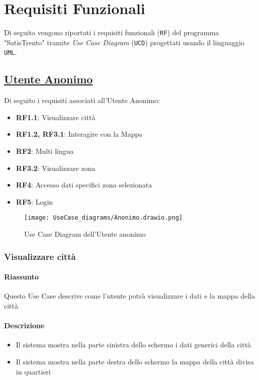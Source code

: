 \chapter{Requisiti Funzionali}
\label{ch:requisitiFunzionali}

Di seguito vengono riportati i requisiti funzionali (\texttt{RF}) del programma "SatisTrento" tramite \textit{Use Case Diagram} (\texttt{UCD}) progettati usando il linguaggio \texttt{UML}.

\section{\underline{Utente Anonimo}}
    Di seguito i requisiti associati all'Utente Anonimo:
    \begin{itemize}
        \item \textbf{RF1.1}: Visualizzare città
        \item \textbf{RF1.2, RF3.1}: Interagire con la Mappa
        \item \textbf{RF2}: Multi lingua
        \item \textbf{RF3.2}: Visualizzare zona
        \item \textbf{RF4}: Accesso dati specifici zona selezionata
        \item \textbf{RF5}: Login
    \end{itemize}
    \begin{figure}[H]
        \centering
        \texttt{[image: UseCase\_diagrams/Anonimo.drawio.png]}
        \caption{Use Case Diagram dell'Utente anonimo}
    \end{figure}

    \subsection{Visualizzare città}
        \subsubsection{Riassunto}
            Questo Use Case descrive come l'utente potrà visualizzare i dati e la mappa della città
        \subsubsection{Descrizione}
            \begin{itemize}
                \item Il sistema mostra nella parte sinistra dello schermo i dati generici della città
                \item Il sistema mostra nella parte destra dello schermo la mappa della città divisa in quartieri
            \end{itemize}
    
